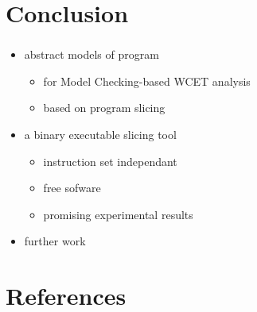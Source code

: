 \documentclass{beamer}
\begin{document}

  \section*{Conclusion}
  \begin{frame}
    \frametitle{\secname}
    \framesubtitle{\subsecname}

    \begin{itemize}
    \item abstract models of program
      \begin{itemize}
        \item for Model Checking-based WCET analysis
        \item based on program slicing
      \end{itemize}
      
    \vspace{1em}
    \item a binary executable slicing tool
      \begin{itemize}
        \item instruction set independant
        \item free sofware
        \item promising experimental results
      \end{itemize}

    \vspace{1em}
    \item further work
        

    \end{itemize}
  \end{frame}
  
  
  \appendix
  \section{References}
  \begin{frame}[allowframebreaks]
    \frametitle{\secname}
    \tiny
    
    
    
  \end{frame}
  
\end{document}
